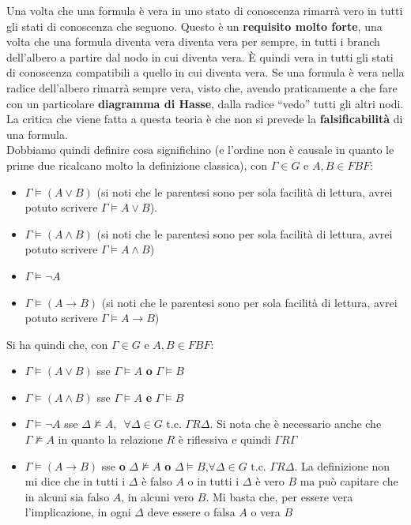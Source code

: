 \documentclass[a4paper,12pt, oneside]{book}
\begin{document}
Una volta che una formula è vera in uno stato di conoscenza rimarrà
vero in tutti gli stati di conoscenza che seguono. Questo è un \textbf{requisito
  molto forte}, una volta che una formula diventa vera diventa vera per sempre,
in tutti i branch dell'albero a partire dal nodo in cui diventa vera. È quindi
vera in tutti gli stati di conoscenza compatibili a quello in cui diventa
vera. Se una formula è vera nella radice dell'albero rimarrà sempre vera, visto
che, avendo praticamente a che fare con un particolare \textbf{diagramma di
  Hasse}, dalla radice ``vedo'' tutti gli altri nodi.\\
La critica che viene fatta a questa teoria è che non si prevede la
\textbf{falsificabilità} di una formula. \\
Dobbiamo quindi definire cosa significhino (e l'ordine non è causale in quanto
le prime due ricalcano molto la definizione classica), con $\Gamma\in G$ e
$A,B\in FBF$: 
\begin{itemize}
  \item $\Gamma\vDash (A\lor B)$ (si noti che le parentesi sono per sola
  facilità di lettura, avrei potuto scrivere $\Gamma\vDash A\lor B$). 
  \item $\Gamma\vDash (A\land B)$ (si noti che le parentesi sono per sola
  facilità di lettura, avrei potuto scrivere $\Gamma\vDash A\land B$)
  \item $\Gamma\vDash \neg A$ 
  \item $\Gamma\vDash (A\to B)$ (si noti che le parentesi sono per sola
  facilità di lettura, avrei potuto scrivere $\Gamma\vDash A\to B$)
\end{itemize}
Si ha quindi che, con $\Gamma\in G$ e $A,B\in FBF$:
\begin{itemize}
  \item $\Gamma\vDash (A\lor B)$ sse $\Gamma\vDash A$ \textbf{o} $\Gamma\vDash
  B$  
  \item $\Gamma\vDash (A\land B)$ sse $\Gamma\vDash A$ \textbf{e} $\Gamma\vDash
  B$  
  \item $\Gamma\vDash \neg A$ sse $\Delta\nvDash A,\,\,\,\forall \Delta\in G
  \mbox{ t.c. } \Gamma R\Delta$. Si nota che è necessario anche che
  $\Gamma\nvDash A$ in quanto la relazione $R$ è riflessiva e quindi $\Gamma R
  \Gamma$ 
  \item $\Gamma\vDash (A\to B)$  sse \textbf{o} $\Delta\nvDash A$ \textbf{o}
  $\Delta\vDash B$,$\forall \Delta\in G \mbox{ t.c. } \Gamma R\Delta$. La
  definizione non mi dice che in tutti i $\Delta$ è falso $A$ o in tutti i
  $\Delta$ è vero $B$ ma può capitare che in alcuni sia falso $A$, in alcuni
  vero $B$. Mi basta che, per essere vera l'implicazione, in ogni $\Delta$ deve
  essere o falsa $A$ o vera $B$
\end{itemize}
\end{document}
